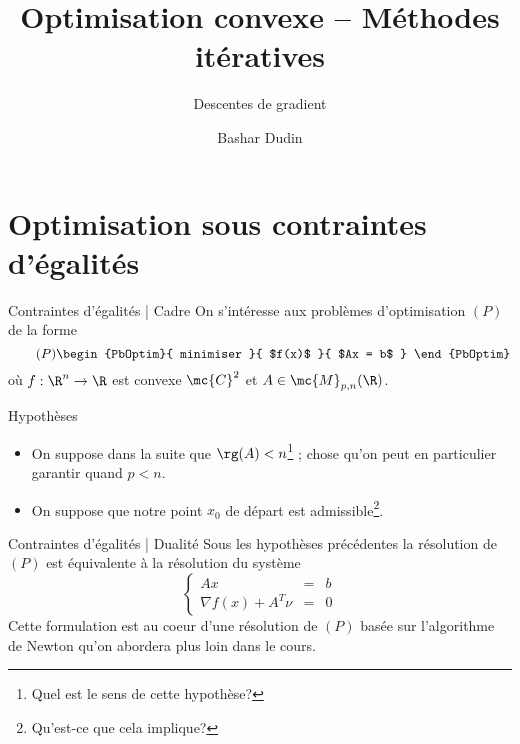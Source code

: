 \documentclass[aspectratio = 169]{beamer}
\author[BD]{Bashar Dudin}
\institute[]{EPITA}
\title{Optimisation convexe -- Méthodes itératives} %
\subtitle{Descentes de gradient}
\begin{document}
\begin{frame}[plain]
\titlepage %
\end{frame}

\section{Optimisation sous contraintes d'égalités}

\begin{frame}{Contraintes d'égalités | Cadre}
  On s'intéresse aux problèmes d'optimisation $(P)$ de la forme
  \begin{equation}
    \label{P}
    \tag{$P$}
    \begin{PbOptim}{
        minimiser
      }{
        $f(x)$
      }{
        $Ax = b$
      }
    \end{PbOptim}
  \end{equation}
où $f :\R^n \to \R$ est convexe $\mc{C}^2$ et
  $A \in \mc{M}_{p, n}(\R)$. \pause
  \begin{halfshyblock}{Hypothèses}
    \begin{itemize}
    \item<2-> On suppose dans la suite que $\rg(A) < n$\footnote{Quel
        est le sens de cette hypothèse?} ; chose qu'on peut en
      particulier garantir quand $ p < n$. 
    \item<2-> On suppose que notre point $x_0$ de départ est
      admissible\footnote{Qu'est-ce que cela implique?}.
    \end{itemize}
  \end{halfshyblock}
\end{frame}

\begin{frame}{Contraintes d'égalités | Dualité}
  Sous les hypothèses précédentes la résolution de $(P)$ est
  équivalente à la résolution du système
  \begin{equation}
    \label{KKT-P}
    \tag{KKT-$P$}
    \left\{
      \begin{array}{ccc}
        Ax & = & b \\
        \nabla f(x) + A^T\nu & = & 0
      \end{array}
    \right.
  \end{equation}
  Cette formulation est au coeur d'une résolution de $(P)$ basée sur
  l'algorithme de Newton qu'on abordera plus loin dans le cours.
\end{frame}
\end{document}
